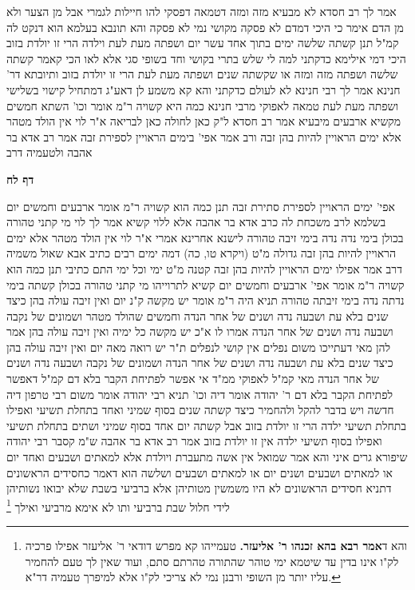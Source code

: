 \documentclass[12pt, openany]{book}
\newcommand{\sethebfont}{
\fontsize{10.5pt}{21.0pt} \selectfont
}
\newcommand{\twocol}[1]{
	{\sethebfont \begin{multicols}{2}
			#1
	\end{multicols}}	
}
\newcommand{\sectname}{}
\newcommand{\newsection}[1]{
	\addcontentsline{toc}{section}{#1}
	\renewcommand{\sectname}{#1}	
	\vspace{-\baselineskip}
	\begin{center}
		\textbf{%
\fontsize{16pt}{16pt}\selectfont
			#1}
	\end{center}
	\vspace{-\baselineskip}
	\nopagebreak
}
\newcommand{\footnotecomment}[1]{\footnote{#1}}
\newcommand{\commenta}[1]{\footnotecomment{#1}}
\begin{document}
{אמר לך רב חסדא  לא מבעיא מזה ומזה דטמאה דפסקי להו חיילות לגמרי אבל מן הצער ולא מן הדם אימר  כי היכי דמדם לא פסקה מקושי נמי לא פסקה והא תונבא בעלמא הוא דנקט לה קמ"ל 
תנן  קשתה שלשה ימים בתוך אחד עשר יום ושפתה מעת לעת וילדה הרי זו יולדת בזוב 
היכי דמי  אילימא כדקתני למה לי שלש  בתרי בקושי וחד בשופי סגי 
אלא לאו הכי קאמר  קשתה שלשה ושפתה מזה ומזה או שקשתה שנים ושפתה מעת לעת הרי זו יולדת בזוב ותיובתא דר' חנינא 
אמר לך רבי חנינא  לא לעולם כדקתני והא קא משמע  לן דאע"ג דמתחיל קישוי בשלישי ושפתה מעת לעת טמאה לאפוקי מרבי חנינא
כמה היא קשויה ר"מ אומר וכו' השתא חמשים מקשיא ארבעים מיבעיא  אמר רב חסדא  ל"ק כאן לחולה כאן לבריאה 
א"ר לוי  אין הולד מטהר אלא ימים הראויין להיות בהן זבה  ורב אמר  אפי' בימים הראויין לספירת זבה  אמר רב אדא בר אהבה  ולטעמיה דרב}

\newsection{דף לח}
\twocol{אפי' ימים הראויין לספירת סתירת זבה 
תנן כמה הוא קשויה  ר"מ אומר  ארבעים וחמשים יום 
בשלמא לרב משכחת לה כרב אדא בר אהבה אלא ללוי קשיא
אמר לך לוי מי קתני טהורה בכולן  בימי נדה נדה בימי זיבה טהורה 
לישנא אחרינא אמרי א"ר לוי  אין הולד מטהר אלא ימים הראויין להיות בהן זבה גדולה מ"ט (ויקרא טו, כה) דמה ימים רבים כתיב 
אבא שאול משמיה דרב אמר  אפילו ימים הראויין להיות בהן זבה קטנה מ"ט ימי וכל ימי התם כתיבי 
תנן כמה הוא קשויה  ר"מ אומר  אפי' ארבעים וחמשים יום קשיא לתרוייהו  מי קתני טהורה בכולן  קשתה בימי נדתה נדה בימי זיבתה טהורה 
תניא היה ר"מ אומר  יש מקשה ק"נ יום ואין זיבה עולה בהן  כיצד שנים בלא עת
ושבעה נדה ושנים של אחר הנדה וחמשים שהולד מטהר
ושמונים של נקבה ושבעה נדה ושנים של אחר הנדה 
אמרו לו  א"כ יש מקשה כל ימיה ואין זיבה עולה בהן 
אמר להן  מאי דעתייכו משום נפלים אין קושי לנפלים 
ת"ר  יש רואה מאה יום ואין זיבה עולה בהן  כיצד שנים בלא עת ושבעה נדה ושנים של אחר הנדה ושמונים של נקבה ושבעה נדה ושנים של אחר הנדה 
מאי קמ"ל  לאפוקי ממ"ד אי אפשר לפתיחת הקבר בלא דם קמ"ל  דאפשר לפתיחת הקבר בלא דם
ר' יהודה אומר דיה וכו' תניא רבי יהודה אומר משום רבי טרפון  דיה חדשה ויש בדבר להקל ולהחמיר 
כיצד קשתה שנים בסוף שמיני ואחד בתחלת תשיעי ואפילו בתחלת תשיעי ילדה הרי זו יולדת בזוב
אבל קשתה יום אחד בסוף שמיני ושתים בתחלת תשיעי ואפילו בסוף תשיעי ילדה אין זו יולדת בזוב 
אמר רב אדא בר אהבה  ש"מ קסבר רבי יהודה שיפורא גרים  איני והא אמר שמואל  אין אשה מתעברת ויולדת אלא למאתים ושבעים ואחד יום או למאתים ושבעים ושנים יום או למאתים ושבעים ושלשה 
הוא דאמר כחסידים הראשונים דתניא  חסידים הראשונים לא היו משמשין מטותיהן אלא ברביעי בשבת שלא יבואו נשותיהן
לידי חלול שבת  ברביעי ותו לא  אימא  מרביעי ואילך 
\commenta{ והא ד\textbf{אמר רבא בהא זכנהו ר' אליעזר.}  טעמייהו קא מפרש דודאי ר' אליעזר אפילו פרכיה לק"ו אינו בדין עד שיטמא ימי טוהר שהתורה טהרתם סתם, ועוד שאין לך טעם להחמיר עליו יותר מן השופי ורבנן נמי לא צריכי לק"ו אלא למיפרך טעמיה דר"א. }

}
\end{document}
